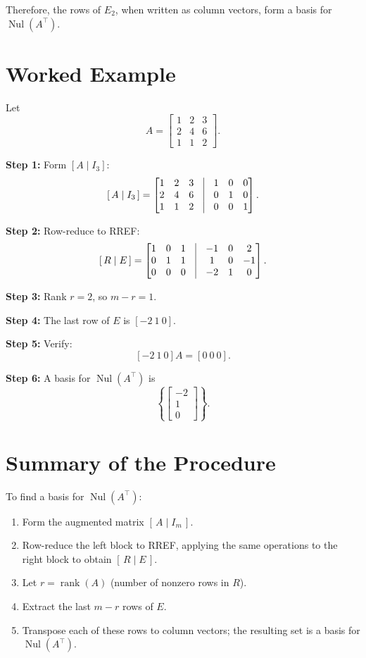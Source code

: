 \documentclass{article}
\begin{document}
Therefore, the rows of $E_2$, when written as column vectors, form a basis for $\operatorname{Nul}(A^\top)$.

\section*{Worked Example}

Let
\[
A = \begin{bmatrix}
1 & 2 & 3 \\
2 & 4 & 6 \\
1 & 1 & 2
\end{bmatrix}.
\]

\textbf{Step 1:} Form $[A \mid I_3]$:
\[
\left[\, A \mid I_3 \,\right] =
\begin{bmatrix}
1 & 2 & 3 & \vline & 1 & 0 & 0 \\
2 & 4 & 6 & \vline & 0 & 1 & 0 \\
1 & 1 & 2 & \vline & 0 & 0 & 1
\end{bmatrix}.
\]

\textbf{Step 2:} Row-reduce to RREF:
\[
\left[\, R \mid E \,\right] =
\begin{bmatrix}
1 & 0 & 1 & \vline & -1 & 0 & 2 \\
0 & 1 & 1 & \vline & 1 & 0 & -1 \\
0 & 0 & 0 & \vline & -2 & 1 & 0
\end{bmatrix}.
\]

\textbf{Step 3:} Rank $r = 2$, so $m - r = 1$.

\textbf{Step 4:} The last row of $E$ is $[-2\ 1\ 0]$.

\textbf{Step 5:} Verify:
\[
[-2\ 1\ 0] A = [0\ 0\ 0].
\]

\textbf{Step 6:} A basis for $\operatorname{Nul}(A^\top)$ is
\[
\left\{ \begin{bmatrix} -2 \\ 1 \\ 0 \end{bmatrix} \right\}.
\]

\section*{Summary of the Procedure}

To find a basis for $\operatorname{Nul}(A^\top)$:
\begin{enumerate}
    \item Form the augmented matrix $[\, A \mid I_m \,]$.
    \item Row-reduce the left block to RREF, applying the same operations to the right block to obtain $[\, R \mid E \,]$.
    \item Let $r = \operatorname{rank}(A)$ (number of nonzero rows in $R$).
    \item Extract the last $m - r$ rows of $E$.
    \item Transpose each of these rows to column vectors; the resulting set is a basis for $\operatorname{Nul}(A^\top)$.
\end{enumerate}
\end{document}

